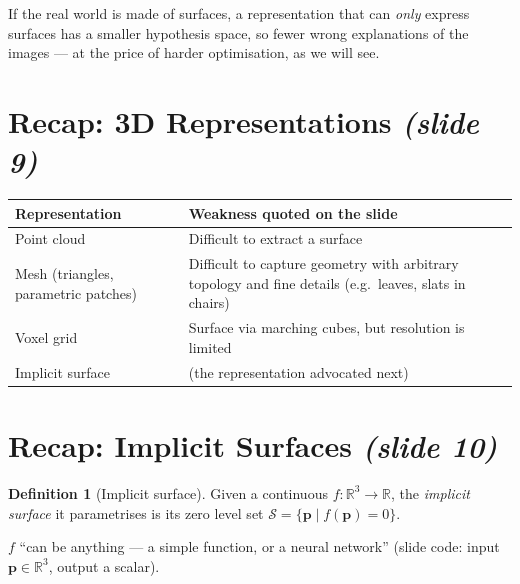 \documentclass[11pt,a4paper]{article}
\newcommand{\R}{\mathbb{R}}
\newcommand{\bp}{{\bm{p}}}
\theoremstyle{definition}
\newtheorem{definition}{Definition}[section]
\theoremstyle{plain}
\theoremstyle{remark}
\begin{document}

\begin{intuition}
If the real world is made of surfaces, a representation that can \emph{only} express surfaces has a smaller
hypothesis space, so fewer wrong explanations of the images --- at the price of harder optimisation, as we will see.
\end{intuition}

\section{Recap: 3D Representations \emph{(slide 9)}}
\begin{center}
\begin{tabular}{@{}p{3.2cm}p{9.5cm}@{}}
\toprule
Representation & Weakness quoted on the slide\\
\midrule
Point cloud & Difficult to extract a surface\\
Mesh (triangles, parametric patches) & Difficult to capture geometry with arbitrary topology and fine details (e.g.\ leaves, slats in chairs)\\
Voxel grid & Surface via marching cubes, but resolution is limited\\
Implicit surface & (the representation advocated next)\\
\bottomrule
\end{tabular}
\end{center}

\section{Recap: Implicit Surfaces \emph{(slide 10)}}
\begin{definition}[Implicit surface]\label{def:implicit}
Given a continuous $f:\R^3\to\R$, the \emph{implicit surface} it parametrises is its zero level set
$\mathcal S=\{\bp\mid f(\bp)=0\}$.
\end{definition}
$f$ ``can be anything --- a simple function, or a neural network'' (slide code: input $\bp\in\R^3$, output a scalar).
\end{document}
